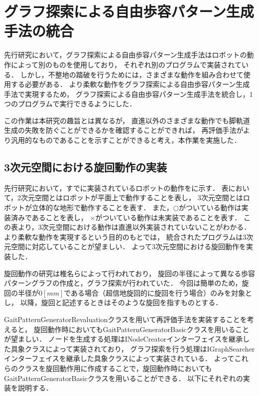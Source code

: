\newpage

\section{グラフ探索による自由歩容パターン生成手法の統合}
先行研究において，グラフ探索による自由歩容パターン生成手法はロボットの動作によって別のものを使用しており，
それぞれ別のプログラムで実装されている．
しかし，不整地の踏破を行うためには，さまざまな動作を組み合わせて使用する必要がある．
より柔軟な動作をグラフ探索による自由歩容パターン生成手法で実現するため，
グラフ探索による自由歩容パターン生成手法を統合し，1つのプログラムで実行できるようにした．

この作業は本研究の趣旨とは異なるが，
直進以外のさまざまな動作でも脚軌道生成の失敗を防ぐことができるかを確認することができれば，
再評価手法がより汎用的なものであることを示すことができると考え，本作業を実施した．

\subsection{3次元空間における旋回動作の実装}
先行研究において，すでに実装されているロボットの動作をに示す．
表において，2次元空間とはロボットが平面上で動作することを表し，
3次元空間とはロボットが立体的な地形で動作することを表す．
また，$\bigcirc$がついている動作は実装済みであることを表し，
$\times$がついている動作は未実装であることを表す．
この表より，3次元空間における動作は直進以外実装されていないことがわかる．
より柔軟な動作を実現するという目的のもとでは，
統合されたプログラムは3次元空間に対応していることが望ましい．
よって3次元空間における旋回動作を実装した．

旋回動作の研究は椎名ら\cite{Shina_Graph_search}によって行われており，
旋回の半径によって異なる歩容パターングラフの作成と，グラフ探索が行われていた．
今回は簡単のため，旋回の半径が$0 [mm]$である場合（超信地旋回的に旋回を行う場合）のみを対象とし，
以降，旋回と記述するときはそのような旋回を指すものとする．

GaitPatternGeneratorRevaluationクラスを用いて再評価手法を実装することを考えると，
旋回動作時においてもGaitPatternGeneratorBasicクラスを用いることが望ましい．
ノードを生成する処理はINodeCreatorインターフェイスを継承した具象クラスによって実装されており，
グラフ探索を行う処理はIGraphSearcherインターフェイスを継承した具象クラスによって実装されている．
よってこれらのクラスを旋回動作用に作成することで，旋回動作時においても
GaitPatternGeneratorBasicクラスを用いることができる．
以下にそれぞれの実装を説明する．

